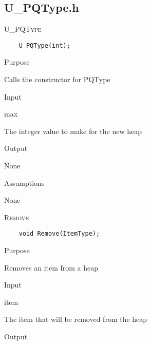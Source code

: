 \documentclass[pdftex, 12pt]{article}
\begin{document}
\subsection{U\_PQType.h}
\begin{description}

	\item{\textsc{U\_PQType}}
\begin{lstlisting}
	U_PQType(int);
\end{lstlisting}
		\begin{description}

			\item{Purpose}

				Calls the constructor for PQType

			\item{Input}

				\begin{description}

					\item{max}

						The integer value to make for the new heap

				\end{description}

			\item{Output}

				None

			\item{Assumptions}

				None

		\end{description}
	\item{\textsc{Remove}}
\begin{lstlisting}
	void Remove(ItemType);
\end{lstlisting}
		\begin{description}

			\item{Purpose}

				Removes an item from a heap

			\item{Input}

				\begin{description}

					\item{item}

						The item that will be removed from the heap

				\end{description}

			\item{Output}


\end{description}
\end{description}
\end{document}
